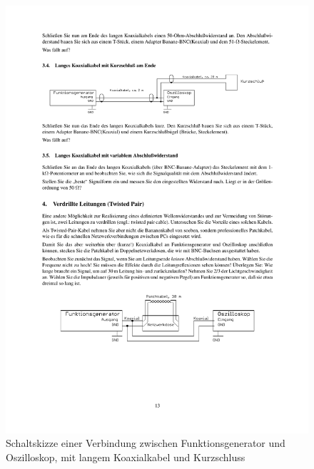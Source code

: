 \documentclass[12pt,a4paper]{article}
\begin{document}
\begin{figure}[H] 
  \centering
    \includegraphics[trim = 10mm 220mm 10mm 45mm, clip, scale = 1]{3_4-4.pdf}
  	\caption[Schaltskizze einer Verbindung zwischen Funktionsgenerator und Oszilloskop, mit langem Koaxialkabel und Kurzschluss]{Schaltskizze einer Verbindung zwischen Funktionsgenerator und Oszilloskop, mit langem Koaxialkabel und Kurzschluss\footnotemark}
  \label{fig:3.4}
\end{figure}
\end{document}
